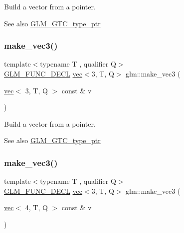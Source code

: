 Build a vector from a pointer. \begin{DoxySeeAlso}{See also}
\hyperlink{group__gtc__type__ptr}{G\+L\+M\+\_\+\+G\+T\+C\+\_\+type\+\_\+ptr} 
\end{DoxySeeAlso}
\mbox{\label{group__gtc__type__ptr_gacd57046034df557b8b1c457f58613623}} 
\subsubsection{\texorpdfstring{make\+\_\+vec3()}{make\_vec3()}\hspace{0.1cm}{\footnotesize\ttfamily [3/5]}}
{\footnotesize\ttfamily template$<$typename T , qualifier Q$>$ \\
\hyperlink{setup_8hpp_ab2d052de21a70539923e9bcbf6e83a51}{G\+L\+M\+\_\+\+F\+U\+N\+C\+\_\+\+D\+E\+CL} \hyperlink{structglm_1_1vec}{vec}$<$3, T, Q$>$ glm\+::make\+\_\+vec3 (\begin{DoxyParamCaption}\item[{\hyperlink{structglm_1_1vec}{vec}$<$ 3, T, Q $>$ const \&}]{v }\end{DoxyParamCaption})\hspace{0.3cm}{\ttfamily [inline]}}

Build a vector from a pointer. \begin{DoxySeeAlso}{See also}
\hyperlink{group__gtc__type__ptr}{G\+L\+M\+\_\+\+G\+T\+C\+\_\+type\+\_\+ptr} 
\end{DoxySeeAlso}
\mbox{\label{group__gtc__type__ptr_ga8b589ed7d41a298b516d2a69169248f1}} 
\subsubsection{\texorpdfstring{make\+\_\+vec3()}{make\_vec3()}\hspace{0.1cm}{\footnotesize\ttfamily [4/5]}}
{\footnotesize\ttfamily template$<$typename T , qualifier Q$>$ \\
\hyperlink{setup_8hpp_ab2d052de21a70539923e9bcbf6e83a51}{G\+L\+M\+\_\+\+F\+U\+N\+C\+\_\+\+D\+E\+CL} \hyperlink{structglm_1_1vec}{vec}$<$3, T, Q$>$ glm\+::make\+\_\+vec3 (\begin{DoxyParamCaption}\item[{\hyperlink{structglm_1_1vec}{vec}$<$ 4, T, Q $>$ const \&}]{v }\end{DoxyParamCaption})\hspace{0.3cm}{\ttfamily [inline]}}

